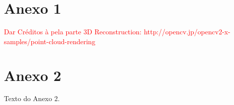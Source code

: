 \chapter{Anexo 1}
\label{Anexo1}

\textcolor{red}{Dar Créditos à pela parte 3D Reconstruction: http://opencv.jp/opencv2-x-samples/point-cloud-rendering}

\chapter{Anexo 2}
\label{Anexo2}

Texto do Anexo 2.



